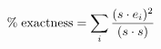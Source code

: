 \begin{equation}
\% \;{\rm exactness} = \sum_{i}\frac{(s \cdot e_i)^2}{ (s \cdot s)} 
\end{equation}

